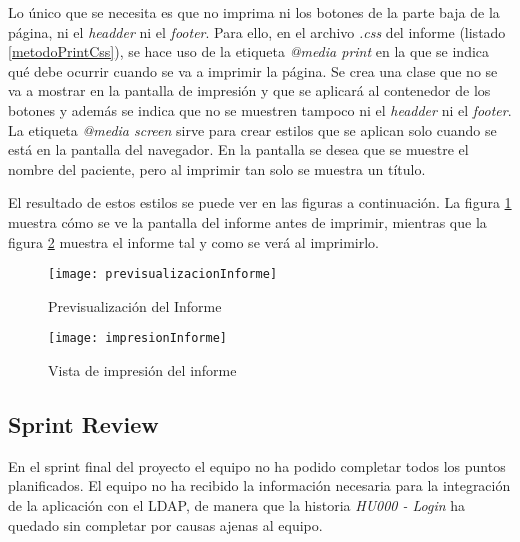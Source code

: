 Lo único que se necesita es que no imprima ni los botones de la parte baja de la página, ni el \emph{headder} ni el \emph{footer}. Para ello, en el archivo \emph{.css} del informe (listado \ref{metodoPrintCss}), se hace uso de la etiqueta \emph{@media print} en la que se indica qué debe ocurrir cuando se va a imprimir la página. Se crea una clase que no se va a mostrar en la pantalla de impresión y que se aplicará al contenedor de los botones y además se indica que no se muestren tampoco ni el \emph{headder} ni el \emph{footer}. La etiqueta \emph{@media screen} sirve para crear estilos que se aplican solo cuando se está en la pantalla del navegador. En la pantalla se desea que se muestre el nombre del paciente, pero al imprimir tan solo se muestra un título.



El resultado de estos estilos se puede ver en las figuras a continuación. La figura \ref{fig:previsualizacionInforme} muestra cómo se ve la pantalla del informe antes de imprimir, mientras que la figura \ref{fig:impresionInforme} muestra el informe tal y como se verá al imprimirlo.

\begin{figure}[!h]
\begin{center}
\texttt{[image: previsualizacionInforme]}
\caption{Previsualización del Informe}
\label{fig:previsualizacionInforme}
\end{center}
\end{figure}

\begin{figure}[!h]
\begin{center}
\texttt{[image: impresionInforme]}
\caption{Vista de impresión del informe}
\label{fig:impresionInforme}
\end{center}
\end{figure}
\clearpage
\subsection{Sprint Review}
\label{subsec:S6-SR}

En el sprint final del proyecto el equipo no ha podido completar todos los puntos planificados. El equipo no ha recibido la información necesaria para la integración de la aplicación con el LDAP, de manera que la historia \emph{HU000 - Login} ha quedado sin completar por causas ajenas al equipo.

